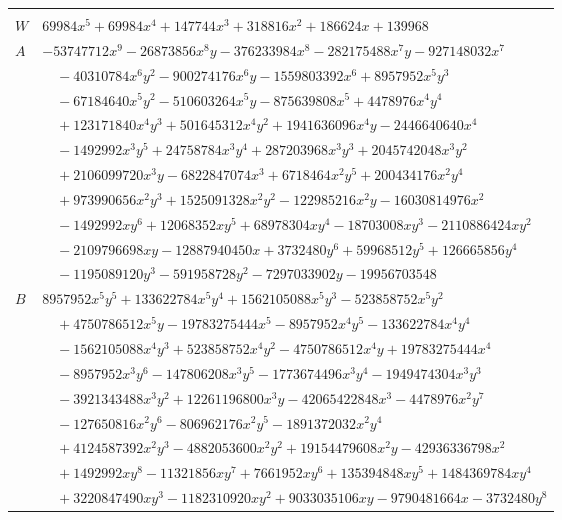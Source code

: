 \documentclass[11pt]{article}
\begin{document}
\begin{longtable}{@{}ll@{}}
\addlinespace[3pt]
\multicolumn{2}{@{}l}{$i=50$, $m=2592$, neighbours $114,8,29,58,64,70,76,106$}\\
$W$ & $69984x^{5}+69984x^{4}+147744x^{3}+318816x^{2}+186624x+139968$\\
$A$ & $-53747712x^{9}-26873856x^{8}y-376233984x^{8}-282175488x^{7}y-927148032x^{7}$\\
 & $\quad -40310784x^{6}y^{2}-900274176x^{6}y-1559803392x^{6}+8957952x^{5}y^{3}$\\
 & $\quad -67184640x^{5}y^{2}-510603264x^{5}y-875639808x^{5}+4478976x^{4}y^{4}$\\
 & $\quad +123171840x^{4}y^{3}+501645312x^{4}y^{2}+1941636096x^{4}y-2446640640x^{4}$\\
 & $\quad -1492992x^{3}y^{5}+24758784x^{3}y^{4}+287203968x^{3}y^{3}+2045742048x^{3}y^{2}$\\
 & $\quad +2106099720x^{3}y-6822847074x^{3}+6718464x^{2}y^{5}+200434176x^{2}y^{4}$\\
 & $\quad +973990656x^{2}y^{3}+1525091328x^{2}y^{2}-122985216x^{2}y-16030814976x^{2}$\\
 & $\quad -1492992xy^{6}+12068352xy^{5}+68978304xy^{4}-18703008xy^{3}-2110886424xy^{2}$\\
 & $\quad -2109796698xy-12887940450x+3732480y^{6}+59968512y^{5}+126665856y^{4}$\\
 & $\quad -1195089120y^{3}-591958728y^{2}-7297033902y-19956703548$\\
$B$ & $8957952x^{5}y^{5}+133622784x^{5}y^{4}+1562105088x^{5}y^{3}-523858752x^{5}y^{2}$\\
 & $\quad +4750786512x^{5}y-19783275444x^{5}-8957952x^{4}y^{5}-133622784x^{4}y^{4}$\\
 & $\quad -1562105088x^{4}y^{3}+523858752x^{4}y^{2}-4750786512x^{4}y+19783275444x^{4}$\\
 & $\quad -8957952x^{3}y^{6}-147806208x^{3}y^{5}-1773674496x^{3}y^{4}-1949474304x^{3}y^{3}$\\
 & $\quad -3921343488x^{3}y^{2}+12261196800x^{3}y-42065422848x^{3}-4478976x^{2}y^{7}$\\
 & $\quad -127650816x^{2}y^{6}-806962176x^{2}y^{5}-1891372032x^{2}y^{4}$\\
 & $\quad +4124587392x^{2}y^{3}-4882053600x^{2}y^{2}+19154479608x^{2}y-42936336798x^{2}$\\
 & $\quad +1492992xy^{8}-11321856xy^{7}+7661952xy^{6}+135394848xy^{5}+1484369784xy^{4}$\\
 & $\quad +3220847490xy^{3}-1182310920xy^{2}+9033035106xy-9790481664x-3732480y^{8}$\\

\end{longtable}
\end{document}
